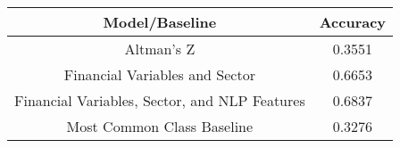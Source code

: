 \footnotesize
\begin{tabular}{cc}
\toprule
Model/Baseline & Accuracy \\
\midrule
Altman's Z & 0.3551 \\
Financial Variables and Sector & 0.6653 \\
Financial Variables, Sector, and NLP Features & 0.6837 \\
Most Common Class Baseline & 0.3276 \\
\bottomrule
\end{tabular}

\normalsize
